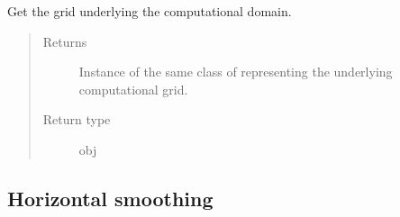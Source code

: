 \documentclass[letterpaper,10pt,english]{sphinxmanual}
\begin{document}
\begin{fulllineitems}
\begin{fulllineitems}
\begin{quote}
\begin{description}
\end{description}\end{quote}

\end{fulllineitems}


\begin{fulllineitems}
\label{\detokenize{api:tasmania.dycore.horizontal_boundary_relaxed.RelaxedSymmetricYZ.get_computational_grid}}
Get the  grid underlying the computational domain.
\begin{quote}\begin{description}
\item[{Returns}] \leavevmode
Instance of the same class of 
representing the underlying computational grid.

\item[{Return type}] \leavevmode
obj

\end{description}\end{quote}

\end{fulllineitems}


\end{fulllineitems}



\subsection{Horizontal smoothing}
\label{\detokenize{api:horizontal-smoothing}}
\end{document}
